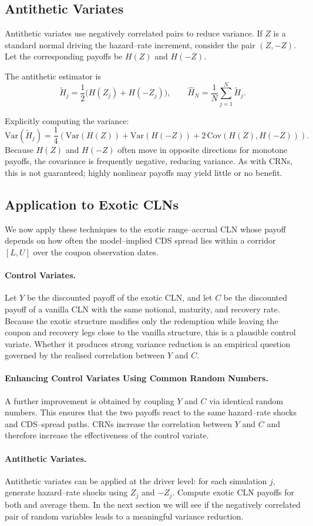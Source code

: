 \subsection{Antithetic Variates}

Antithetic variates use negatively correlated pairs to reduce variance. If $Z$
is a standard normal driving the hazard--rate increment, consider the pair
$(Z, -Z)$. Let the corresponding payoffs be $H(Z)$ and $H(-Z)$.

The antithetic estimator is
\[
\tilde{H}_j = \frac{1}{2}\bigl( H(Z_j) + H(-Z_j) \bigr),
\qquad
\hat{H}_N = \frac{1}{N}\sum_{j=1}^N \tilde{H}_j.
\]

Explicitly computing the variance:
\[
\mathrm{Var}(\tilde{H}_j)
= \frac{1}{4}\left(
\mathrm{Var}(H(Z)) + \mathrm{Var}(H(-Z))
+ 2\,\mathrm{Cov}(H(Z),H(-Z))
\right).
\]
Because $H(Z)$ and $H(-Z)$ often move in opposite directions for monotone
payoffs, the covariance is frequently negative, reducing variance. As with
CRNs, this is not guaranteed; highly nonlinear payoffs may yield little or no
benefit.

\subsection{Application to Exotic CLNs}

We now apply these techniques to the exotic range--accrual CLN whose payoff
depends on how often the model--implied CDS spread lies within a corridor
$[L,U]$ over the coupon observation dates.

\paragraph{Control Variates.}
Let $Y$ be the discounted payoff of the exotic CLN, and let $C$ be the
discounted payoff of a vanilla CLN with the same notional, maturity, and
recovery rate. Because the exotic structure modifies only the redemption while
leaving the coupon and recovery legs close to the vanilla structure, this is a
plausible control variate. Whether it produces strong variance reduction is an
empirical question governed by the realised correlation between $Y$ and $C$.

\paragraph{Enhancing Control Variates Using Common Random Numbers.}
A further improvement is obtained by coupling $Y$ and $C$ via identical random
numbers. This ensures that the two payoffs react to the same hazard--rate
shocks and CDS--spread paths. CRNs increase the correlation between $Y$ and $C$
and therefore increase the effectiveness of the control variate.

\paragraph{Antithetic Variates.}
Antithetic variates can be applied at the driver level: for each simulation
$j$, generate hazard--rate shocks using $Z_j$ and $-Z_j$. Compute exotic CLN
payoffs for both and average them. In the next section we will see if the negatively
correlated pair of random variables leads to a meaningful variance reduction. 
